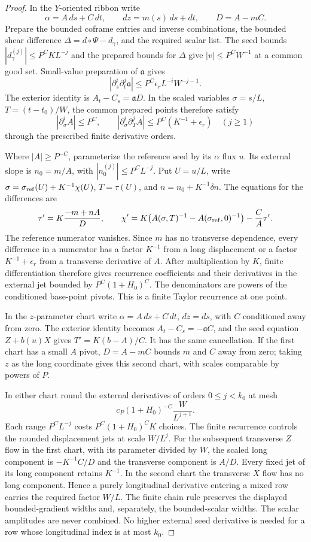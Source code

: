 \documentclass[11pt]{amsart}
\theoremstyle{definition}
\theoremstyle{remark}
\numberwithin{equation}{section}
\begin{document}
\begin{proof}
In the $Y$-oriented ribbon write
\[
\alpha=A\,ds+C\,dt,\qquad dz=m(s)\,ds+dt,\qquad D=A-mC.
\]
Prepare the bounded coframe entries and inverse combinations, the bounded shear difference $\Delta=d\circ\Psi-d_\gamma$, and the required scalar list. The seed bounds $|d_\gamma^{(j)}|\le P^CKL^{-j}$ and the prepared bounds for $\Delta$ give $|v|\le P^CW^{-1}$ at a common good set. Small-value preparation of $\mathfrak a$ gives
\[
|\partial_s^i\partial_t^j\mathfrak a|\le P^C\epsilon_rL^{-i}W^{-j-1}.
\]
The exterior identity is $A_t-C_s=\mathfrak aD$. In the scaled variables $\sigma=s/L$, $T=(t-t_0)/W$, the common prepared points therefore satisfy
\[
|\partial_\sigma^i A|\le P^C,\qquad |\partial_\sigma^i\partial_T^j A|\le P^C(K^{-1}+\epsilon_r)\quad(j\ge1)
\]
through the prescribed finite derivative orders.

Where $|A|\ge P^{-C}$, parameterize the reference seed by its $\alpha$ flux $u$. Its external slope is $n_0=m/A$, with $|n_0^{(j)}|\le P^CL^{-j}$. Put $U=u/L$, write $\sigma=\sigma_{\rm ref}(U)+K^{-1}\chi(U)$, $T=\tau(U)$, and $n=n_0+K^{-1}\delta n$. The equations for the differences are
\[
\tau'=K\frac{-m+nA}{D},\qquad
\chi'=K\bigl(A(\sigma,T)^{-1}-A(\sigma_{\rm ref},0)^{-1}\bigr)-\frac CA\tau'.
\]
The reference numerator vanishes. Since $m$ has no transverse dependence, every difference in a numerator has a factor $K^{-1}$ from a long displacement or a factor $K^{-1}+\epsilon_r$ from a transverse derivative of $A$. After multiplication by $K$, finite differentiation therefore gives recurrence coefficients and their derivatives in the external jet bounded by $P^C(1+H_0)^C$. The denominators are powers of the conditioned base-point pivots. This is a finite Taylor recurrence at one point.

In the $z$-parameter chart write $\alpha=A\,ds+C\,dt$, $dz=ds$, with $C$ conditioned away from zero. The exterior identity becomes $A_t-C_s=-\mathfrak a C$, and the seed equation $Z+b(u)X$ gives $T'=K(b-A)/C$. It has the same cancellation. If the first chart has a small $A$ pivot, $D=A-mC$ bounds $m$ and $C$ away from zero; taking $z$ as the long coordinate gives this second chart, with scales comparable by powers of $P$.

In either chart round the external derivatives of orders $0\le j<k_0$ at mesh
\[
c_P(1+H_0)^{-C}\frac{W}{L^{j+1}}.
\]
Each range $P^CL^{-j}$ costs $P^C(1+H_0)^CK$ choices. The finite recurrence controls the rounded displacement jets at scale $W/L^j$. For the subsequent transverse $Z$ flow in the first chart, with its parameter divided by $W$, the scaled long component is $-K^{-1}C/D$ and the transverse component is $A/D$. Every fixed jet of its long component retains $K^{-1}$. In the second chart the transverse $X$ flow has no long component. Hence a purely longitudinal derivative entering a mixed row carries the required factor $W/L$. The finite chain rule preserves the displayed bounded-gradient widths and, separately, the bounded-scalar widths. The scalar amplitudes are never combined. No higher external seed derivative is needed for a row whose longitudinal index is at most $k_0$.


\end{proof}
\end{document}
